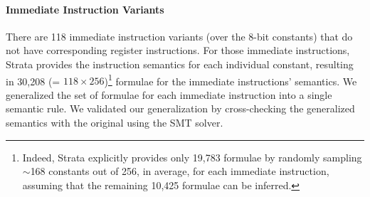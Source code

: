 \paragraph{Immediate Instruction Variants}

There are 118 immediate instruction variants (over the 8-bit constants) that do not have corresponding register instructions.
For those immediate instructions, Strata provides the instruction semantics for each individual constant, resulting in 30,208 (= $118 \times 256$)\footnote{Indeed, Strata explicitly provides only 19,783 formulae by randomly sampling $\sim$168 constants out of 256, in average, for each immediate instruction, assuming that the remaining 10,425 formulae can be inferred.} formulae for the immediate instructions' semantics.
We generalized the set of formulae for each immediate instruction into a single semantic rule.
We validated our generalization by cross-checking the generalized semantics with the original using the SMT solver.






